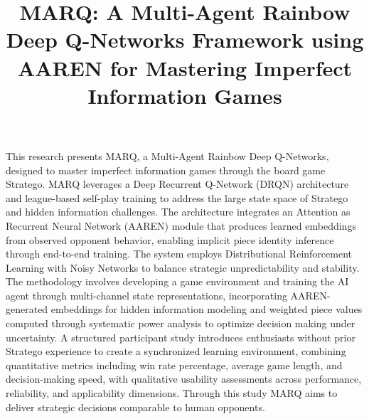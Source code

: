 \documentclass[oneside]{etd}
\title{MARQ: A Multi-Agent Rainbow Deep Q-Networks Framework using AAREN for Mastering Imperfect Information Games}
\def\maketitle{}%
\def\makerecomm{}%
\def\makeacceptance{}%
\def\makedeclaration{}%
\renewenvironment{abstract}{\comment}{\endcomment}%
\begin{document}
\maketitle
\makerecomm
\makeacceptance
\makedeclaration

\begin{abstract}
This research presents MARQ, a Multi-Agent Rainbow Deep Q-Networks, designed to master imperfect information games through the board game Stratego. MARQ leverages a Deep Recurrent Q-Network (DRQN) architecture and league-based self-play training to address the large state space of Stratego and hidden information challenges. The architecture integrates an Attention as Recurrent Neural Network (AAREN) module that produces learned embeddings from observed opponent behavior, enabling implicit piece identity inference through end-to-end training. The system employs Distributional Reinforcement Learning with Noisy Networks to balance strategic unpredictability and stability. The methodology involves developing a game environment and training the AI agent through multi-channel state representations, incorporating AAREN-generated embeddings for hidden information modeling and weighted piece values computed through systematic power analysis to optimize decision making under uncertainty. A structured participant study introduces enthusiasts without prior Stratego experience to create a synchronized learning environment, combining quantitative metrics including win rate percentage, average game length, and decision-making speed, with qualitative usability assessments across performance, reliability, and applicability dimensions. Through this study MARQ aims to deliver strategic decisions comparable to human opponents.
\end{abstract}


\beginbody
{}







% 
% 

%   
%   
%   
%   
%   

\nocite{*}

{
\singlespace

}

% 
\end{document}
